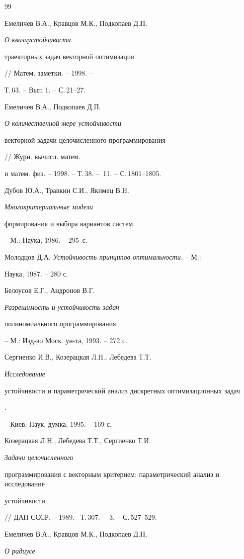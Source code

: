 \begin{thebibliography}{99}







Емеличев В.А., Кравцов М.К., Подкопаев Д.П. {\it О квазиустойчивости


траекторных задач векторной оптимизации} // Матем. заметки. -- 1998. --


Т.\,63. -- Вып.\,1. -- С.\,21--27.




Емеличев В.А., Подкопаев Д.П. {\it О количественной мере устойчивости


векторной задачи целочисленного программирования} // Журн. вычисл. матем.


и матем. физ. -- 1998. -- Т.\,38. -- \No\,11. -- С.\,1801--1805.




Дубов Ю.А., Травкин С.И., Якимец В.Н. {\it Многокритериальные модели


формирования и выбора вариантов систем.} -- М.: Наука, 1986. -- 295~с.




Молодцов Д.А. {\it Устойчивость принципов оптимальности.} -- М.:


Наука, 1987. -- 280 с.




Белоусов Е.Г., Андронов В.Г. {\it Разрешимость и устойчивость задач


полиномиального программирования.} -- М.: Изд-во Моск. ун-та, 1993. -- 272 с.




Сергиенко И.В., Козерацкая Л.Н., Лебедева Т.Т. {\it Исследование


устойчивости и параметрический анализ дискретных оптимизационных задач}.


-- Киев: Наук. думка, 1995. -- 169 с.




Козерацкая Л.Н., Лебедева Т.Т., Сергиенко Т.И. {\it Задачи целочисленного


программирования с векторным критерием: параметрический анализ и исследование


устойчивости} // ДАН СССР. -- 1989.-- Т.\,307. -- \No\,3. -- С.\,527--529.




Емеличев В.А., Кравцов М.К., Подкопаев Д.П. {\it О радиусе


}
\end{thebibliography}
